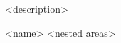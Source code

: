 \begin{ExampleBlock}{}
\begin{RpgMap}[<options>]
     <description>

    \begin{RpgArea}[<label>]{<name>}
        <nested areas>
    \end{RpgArea}
\end{RpgMap}


\end{ExampleBlock}

